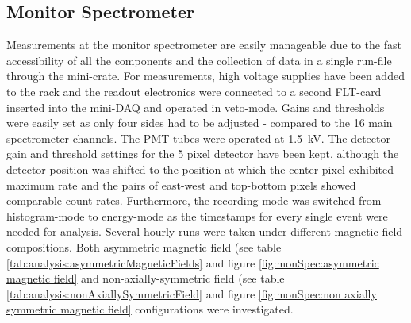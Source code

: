   \subsection{Monitor Spectrometer}
  \label{ch:Analysis:sec:Monitor Spectrometer Measurements:subsec:Monitor Spectrometer}
  
  Measurements at the monitor spectrometer are easily manageable due to the fast accessibility of all the components and the collection of data in a single run-file through the mini-crate.
  For measurements, high voltage supplies have been added to the  rack and the readout electronics were connected to a second FLT-card inserted into the mini-DAQ and operated in veto-mode. Gains and thresholds were easily set as only four sides had to be adjusted - compared to the 16 main spectrometer channels. The PMT tubes were operated at \SI{1.5}{\kilo\volt}. The detector gain and threshold settings for the 5 pixel detector have been kept, although the detector position was shifted to the position at which the center pixel exhibited maximum rate and the pairs of east-west and top-bottom pixels showed comparable count rates. Furthermore, the recording mode was switched from histogram-mode to energy-mode as the timestamps for every single event were needed for analysis. 
  Several hourly runs were taken under different magnetic field compositions. Both asymmetric magnetic field (see table \ref{tab:analysis:asymmetricMagneticFields} and figure \ref{fig:monSpec:asymmetric magnetic field} and non-axially-symmetric field (see table \ref{tab:analysis:nonAxiallySymmetricField} and figure \ref{fig:monSpec:non axially symmetric magnetic field} configurations were investigated.
